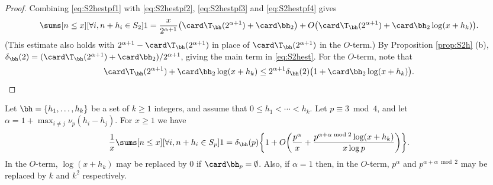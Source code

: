 \documentclass[12pt, reqno, twoside, letterpaper]{amsart}
\begin{document}
\begin{nix}
\begin{proof}
Combining \eqref{eq:S2hestpf1} with \eqref{eq:S2hestpf2}, 
\eqref{eq:S2hestpf3} and \eqref{eq:S2hestpf4} gives 
\[
  \sums[n \le x][\forall i, n + h_i \in S_2] 1
  =
    \frac{x}{2^{\alpha + 1}}
     \big(\card \T_{\bh}(2^{\alpha + 1}) + \card \bh_2\big)
     + 
      O\big(
        \card \T_{\bh}(2^{\alpha + 1}) 
       + \card\bh_2 \log(x + h_k) 
       \big).
\]
%
(This estimate also holds with 
$2^{\alpha + 1} - \card \T_{\bh}(2^{\alpha + 1})$ in place of 
$\card \T_{\bh}(2^{\alpha + 1})$ in the $O$-term.)
%
By Proposition \ref{prop:S2h} (b), 
$
  \delta_{\bh}(2)
   =
    (\card \T_{\bh}(2^{\alpha + 1}) + \card \bh_2)/2^{\alpha + 1} 
$, 
giving the main term in \eqref{eq:S2hest}.
%
For the $O$-term, note that 
\[
 \card \T_{\bh}(2^{\alpha + 1}) + \card\bh_2 \log(x + h_k)
  \le 
   2^{\alpha + 1}\delta_{\bh}(2)\big(1 + \card \bh_2\log(x + h_k)\big). 
\]
\end{proof}



\begin{proposition}
 \label{prop:Sp3hest}
Let $\bh = \{h_1,\ldots,h_k\}$ be a set of $k \ge 1$ integers, and 
assume that $0 \le h_1 < \cdots < h_k$.
%
Let $p \equiv 3 \bmod 4$, and let 
$\alpha = 1 + \max_{i \ne j} \nu_p(h_i - h_j)$.
%
For $x \ge 1$ we have  
\begin{equation}
 \label{eq:Sp3hest}
  \frac{1}{x}
   \sums[n \le x][\forall i, n + h_i \in S_p] 1
  =
   \delta_{\bh}(p)
    \bigg\{ 
     1 + O\bigg(\frac{p^{\alpha}}{x} + \frac{p^{\alpha + \alpha \bmod 2} \log(x + h_k)}{x\log p}\bigg)
    \bigg\}.
\end{equation}
%
In the $O$-term, $\log(x + h_k)$ may be replaced by $0$ if 
$\card \bh_p = \emptyset$.
%
Also, if $\alpha = 1$ then, in the $O$-term, $p^{\alpha}$ and 
$p^{\alpha + \alpha \bmod 2}$ may be replaced by $k$ and $k^2$ 
respectively.
\end{proposition}


\end{nix}
\end{document}
